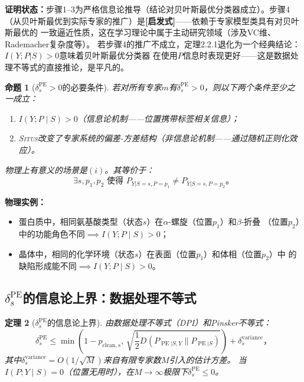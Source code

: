 \documentclass[11pt,a4paper]{article}
\newtheorem{theorem}{定理}[section]
\newtheorem{proposition}[theorem]{命题}
\theoremstyle{remark}
\DeclareMathOperator{\PE}{PE}
\DeclareMathOperator{\KL}{D_{KL}}
\newcommand{\Situs}{\textsc{Situs}}
\newcommand{\heuristic}{\textnormal{\textbf{[启发式]}}}
\begin{document}
\textbf{证明状态：}步骤1--3为严格信息论推导（结论对贝叶斯最优分类器成立）。步骤4
（从贝叶斯最优到实际专家的推广）是\heuristic{}——依赖于专家模型类具有对贝叶斯最优的
一致逼近性质，这在学习理论中属于主动研究领域（涉及VC维、Rademacher复杂度等）。
若步骤4的推广不成立，定理2.2.1退化为一个经典结论：$I(Y;P|S)>0$意味着贝叶斯最优分类器
在使用$P$信息时表现更好——这是数据处理不等式的直接推论，是平凡的。

\begin{proposition}[$\delta_s^{\PE} > 0$的必要条件]
\label{prop:2.2.1}
若对所有专家$m$有$\delta_s^{\PE} > 0$，则以下两个条件至少之一成立：
\begin{enumerate}[label=(\roman*)]
    \item $I(Y; P \mid S) > 0$（信息论机制——位置携带标签相关信息）；
    \item \Situs{}改变了专家系统的偏差-方差结构（非信息论机制——通过随机正则化效应）。
\end{enumerate}
物理上有意义的场景是$(i)$。其等价于：
\begin{equation}
    \exists s, p_1, p_2 \text{ 使得 } P_{Y|S=s, P=p_1} \neq P_{Y|S=s, P=p_2}。
\end{equation}
\end{proposition}

\textbf{物理实例：}
\begin{itemize}
    \item 蛋白质中，相同氨基酸类型（状态$s$）在$\alpha$-螺旋（位置$p_1$）和$\beta$-折叠
          （位置$p_2$）中的功能角色不同$\implies I(Y; P \mid S) > 0$；
    \item 晶体中，相同的化学环境（状态$s$）在表面（位置$p_1$）和体相（位置$p_2$）中
          的缺陷形成能不同$\implies I(Y; P \mid S) > 0$。
\end{itemize}

\subsection{$\delta_s^{\PE}$的信息论上界：数据处理不等式}

\begin{theorem}[$\delta_s^{\PE}$的信息论上界]
\label{thm:2.3.1}
由数据处理不等式（DPI）和Pinsker不等式：
\begin{equation}
    \boxed{
    \delta_s^{\PE} \leq \min\!\left(1 - p_{\text{clean}, s},\,
    \sqrt{\frac{1}{2} D_{\KL}(P_{\PE|S,Y} \| P_{\PE|S})}\right)
    + \delta_s^{\text{variance}}
    }，
\end{equation}
其中$\delta_s^{\text{variance}} = O(1/\sqrt{M})$来自有限专家数$M$引入的估计方差。
当$I(P; Y \mid S) = 0$（位置无用时），在$M \to \infty$极限下$\delta_s^{\PE} \leq 0$。
\end{theorem}
\end{document}
